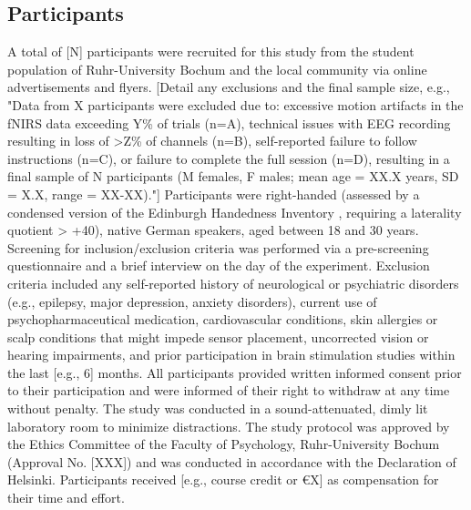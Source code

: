 \subsection{Participants}
A total of [N] participants were recruited for this study from the student population of Ruhr-University Bochum and the local community via online advertisements and flyers. [Detail any exclusions and the final sample size, e.g., "Data from X participants were excluded due to: excessive motion artifacts in the fNIRS data exceeding Y\% of trials (n=A), technical issues with EEG recording resulting in loss of >Z\% of channels (n=B), self-reported failure to follow instructions (n=C), or failure to complete the full session (n=D), resulting in a final sample of N participants (M females, F males; mean age = XX.X years, SD = X.X, range = XX-XX)."] Participants were right-handed (assessed by a condensed version of the Edinburgh Handedness Inventory \parencite{oldfieldAssessmentAnalysisHandedness1971}, requiring a laterality quotient > +40), native German speakers, aged between 18 and 30 years. Screening for inclusion/exclusion criteria was performed via a pre-screening questionnaire and a brief interview on the day of the experiment. Exclusion criteria included any self-reported history of neurological or psychiatric disorders (e.g., epilepsy, major depression, anxiety disorders), current use of psychopharmaceutical medication, cardiovascular conditions, skin allergies or scalp conditions that might impede sensor placement, uncorrected vision or hearing impairments, and prior participation in brain stimulation studies within the last [e.g., 6] months. All participants provided written informed consent prior to their participation and were informed of their right to withdraw at any time without penalty. The study was conducted in a sound-attenuated, dimly lit laboratory room to minimize distractions. The study protocol was approved by the Ethics Committee of the Faculty of Psychology, Ruhr-University Bochum (Approval No. [XXX]) and was conducted in accordance with the Declaration of Helsinki. Participants received [e.g., course credit or €X] as compensation for their time and effort.


